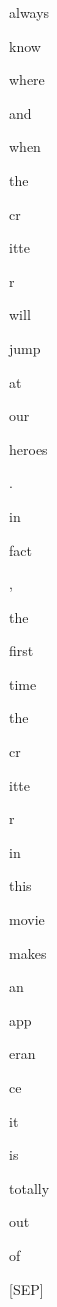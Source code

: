 \documentclass[varwidth=150mm]{standalone}
\begin{document}
\begin{CJK*}{UTF8}{gbsn}
{{{\colorbox{red!0.0}{\strut always} \colorbox{red!0.0}{\strut know} \colorbox{red!2.6990644931793213}{\strut where} \colorbox{red!4.3169121742248535}{\strut and} \colorbox{red!2.664503812789917}{\strut when} \colorbox{red!1.108460783958435}{\strut the} \colorbox{red!9.778326034545898}{\strut cr}\colorbox{red!7.868930816650391}{\strut itte}\colorbox{red!3.2271008491516113}{\strut r} \colorbox{red!3.005718231201172}{\strut will} \colorbox{red!0.0}{\strut jump} \colorbox{red!1.1814366579055786}{\strut at} \colorbox{red!2.4832258224487305}{\strut our} \colorbox{red!10.60628604888916}{\strut heroes} \colorbox{red!0.0}{\strut .} \colorbox{red!0.0}{\strut in} \colorbox{red!10.199710845947266}{\strut fact} \colorbox{red!1.1409226655960083}{\strut ,} \colorbox{red!4.065774917602539}{\strut the} \colorbox{red!0.0}{\strut first} \colorbox{red!2.9747419357299805}{\strut time} \colorbox{red!0.0}{\strut the} \colorbox{red!6.3874192237854}{\strut cr}\colorbox{red!4.495945930480957}{\strut itte}\colorbox{red!2.189232349395752}{\strut r} \colorbox{red!1.820712924003601}{\strut in} \colorbox{red!6.5279436111450195}{\strut this} \colorbox{red!5.003610134124756}{\strut movie} \colorbox{red!0.0}{\strut makes} \colorbox{red!0.0}{\strut an} \colorbox{red!1.0695686340332031}{\strut app}\colorbox{red!1.9376707077026367}{\strut eran}\colorbox{red!2.6181933879852295}{\strut ce} \colorbox{red!7.707205772399902}{\strut it} \colorbox{red!38.80544662475586}{\strut is} \colorbox{red!80.59371948242188}{\strut totally} \colorbox{red!3.5521914958953857}{\strut out} \colorbox{red!34.62712860107422}{\strut of} \colorbox{red!2.245349407196045}{\strut [SEP]}
}}}
\end{CJK*}
\end{document}
